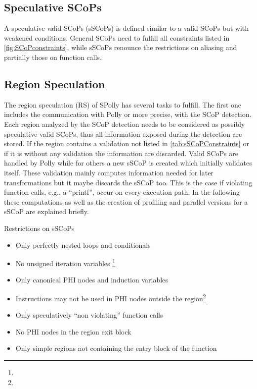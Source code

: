 \begin{shaded}

\subsection{Speculative SCoPs}
A speculative valid SCoPs (sSCoPs) is defined similar to a valid SCoPs but with 
weakened conditions. General SCoPs need to fulfill all constraints listed in
\ref{fig:SCoPconstraints}, while sSCoPs renounce the restrictions on aliasing
and partially those on function calls. 


\subsection{Region Speculation}
The region speculation (RS) of SPolly has several tasks to fulfill. The first 
one includes the communication with Polly or more precise, 
with the SCoP detection. Each region analyzed by the SCoP detection needs to be
considered as possibly speculative valid SCoPs, thus all information exposed 
during the detection are stored. If the region contains a validation not 
listed in \ref{tab:sSCoPConstraints} or if it is without any validation
the information are discarded. Valid SCoPs are handled by Polly while for others
a new sSCoP is created which initially validates itself. 
These validation mainly computes information needed for later
transformations but it maybe discards the sSCoP too. This is the case if 
violating function calls, e.g., a ``printf'', occur on every execution path. 
In the following these computations as well as the creation of 
profiling and parallel versions for a sSCoP are explained briefly. 

\end{shaded}

\begin{table}[htbp]
  \centering
  \caption{Restrictions on sSCoPs}
    \begin{itemize}
      \item Only perfectly nested loops and conditionals
      \item No unsigned iteration variables \footnote{}
      \item Only canonical PHI nodes and induction variables
      \item Instructions may not be used in PHI nodes outside the region\footnote{}
      \item Only speculatively ``non violating'' function calls
      \item No PHI nodes in the region exit block
      \item Only simple regions not containing the entry block of the function
    \end{itemize}
  \label{tab:sSCoPConstraints}
\end{table}


